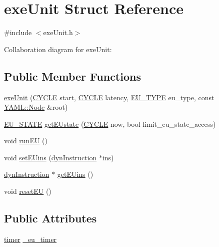 \hypertarget{structexeUnit}{
\section{exeUnit Struct Reference}
\label{structexeUnit}
}


{\ttfamily \#include $<$exeUnit.h$>$}



Collaboration diagram for exeUnit:
\subsection*{Public Member Functions}
\begin{DoxyCompactItemize}
\item 
\hyperlink{structexeUnit_a119cfafaad440fc7fdca7a3665e5de65}{exeUnit} (\hyperlink{global_2global_8h_a7e19a550ec11d1ed921deb20c22efb5b}{CYCLE} start, \hyperlink{global_2global_8h_a7e19a550ec11d1ed921deb20c22efb5b}{CYCLE} latency, \hyperlink{exeUnit_8h_a8184e36081fa22a84c7488c1eaeb0f5d}{EU\_\-TYPE} eu\_\-type, const \hyperlink{classYAML_1_1Node}{YAML::Node} \&root)
\item 
\hyperlink{exeUnit_8h_ac578f59a761f9106ba1a8414e02ab6d8}{EU\_\-STATE} \hyperlink{structexeUnit_a739cfd78a98068a64fb2e807f49c4312}{getEUstate} (\hyperlink{global_2global_8h_a7e19a550ec11d1ed921deb20c22efb5b}{CYCLE} now, bool limit\_\-eu\_\-state\_\-access)
\item 
void \hyperlink{structexeUnit_a69498b2ca8353a14447a5596e768fc55}{runEU} ()
\item 
void \hyperlink{structexeUnit_ad9a4840a6956e01419327ba3123683dd}{setEUins} (\hyperlink{classdynInstruction}{dynInstruction} $\ast$ins)
\item 
\hyperlink{classdynInstruction}{dynInstruction} $\ast$ \hyperlink{structexeUnit_a5414837e2e071fc0180c0326cc33370f}{getEUins} ()
\item 
void \hyperlink{structexeUnit_a31fd51a344347d96c9be688de8e0f97a}{resetEU} ()
\end{DoxyCompactItemize}
\subsection*{Public Attributes}
\begin{DoxyCompactItemize}
\item 
\hyperlink{structtimer}{timer} \hyperlink{structexeUnit_a5dc187ea49bad94bbea24f18232500dd}{\_\-eu\_\-timer}
\end{DoxyCompactItemize}


